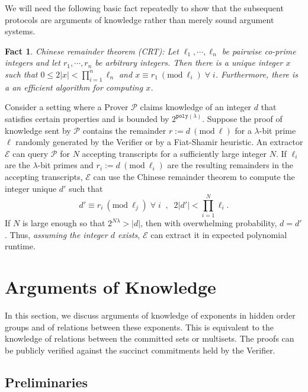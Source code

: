 \documentclass[11pt, lettersize, notitlepage, leqno, footskip=0.6cm]{article}
\newcommand{\pl}{\prod\limits}
\newcommand{\ttt}{\texttt}
\newcommand{\mc}{\mathcal}
\newcommand{\lam}{\lambda}
\newcommand{\mP}{\mc{P}}
\newcommand{\vs}{\vspace{-0.15cm}}
\newcommand{\noin}{\noindent}
\newcommand{\op}{overwhelming probability}
\newcommand{\Mod}[1]{\ (\mathrm{mod}\ #1)}
\newcommand{\E}{\mc{E}}
\newtheorem{Fact}{Fact}[section]
\numberwithin{equation}{section}
\begin{document}
\noin We will need the following basic fact repeatedly to show that the subsequent protocols are arguments of knowledge rather than merely sound argument systems.\vspace{0.1cm}

\begin{Fact}{\normalfont Chinese remainder theorem (CRT):} Let $\ell_1,\cdots,\ell_n$ be pairwise co-prime integers and let $r_1,\cdots,r_n$ be arbitrary integers. Then there is a unique integer $x$ such that $0\leq 2|x|< \prod_{i=1}^n \ell_n$ and $x\equiv r_1\Mod{\ell_i}\;\forall\;i$. Furthermore, there is a an efficient algorithm for computing $x$. \end{Fact}

Consider a setting where a Prover $\mP$ claims knowledge of an integer $d$ that satisfies certain properties and is bounded by $2^{\ttt{poly}(\lam)}$. Suppose the proof of knowledge sent by $\mP$ contains the remainder $r:= d\Mod{\ell}$ for a $\lam$-bit prime $\ell$ randomly generated by the Verifier or by a Fiat-Shamir heuristic. An extractor $\E$ can query $\mP$ for $N$ accepting transcripts for a sufficiently large integer $N$. If $\ell_i$ are the $\lam$-bit primes and $r_i:= d\Mod{\ell_i}$ are the resulting remainders in the accepting transcripts, $\E$ can use the Chinese remainder theorem to compute the integer unique $d'$ such that \vs $$d'\equiv r_i\Mod{\ell_j}\;\forall\;i\;\;,\;\; 2|d'| < \pl_{i=1}^N \ell_i.$$ If $N$ is large enough so that $2^{N\lam} > |d|$, then with \op, $d = d'$. Thus, \textit{assuming the integer $d$ exists}, $\E$ can extract it in expected polynomial runtime.



\section{\fontsize{12}{12}\selectfont Arguments of Knowledge  }

In this section, we discuss arguments of knowledge of exponents in hidden order groups and of relations between these exponents. This is equivalent to the knowledge of relations between the committed sets or multisets. The proofs can be publicly verified against the succinct commitments held by the Verifier.

\subsection{\fontsize{11}{11}\selectfont Preliminaries}
\end{document}
